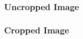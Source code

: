 \documentclass[11pt, hidelinks]{report}
\begin{document}
\subsubsection{Uncropped Image} \label{app:uncrop}
	\begin{center}
	\end{center}

\subsubsection{Cropped Image} \label{app:crop}
	\begin{center}
	\end{center}
	
\end{document}
